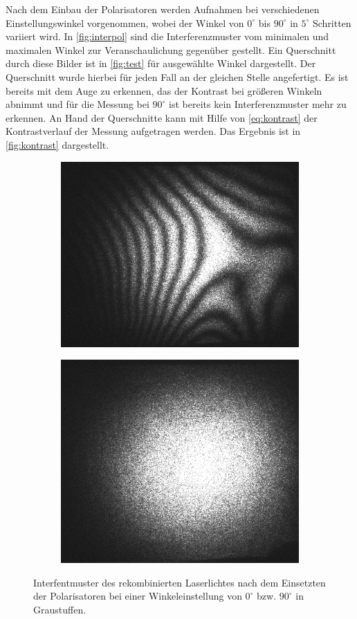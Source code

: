 \documentclass[numbers=noenddot,a4paper,notitlepage,twoside,BCOR15mm]{scrartcl}
\begin{document}
	Nach dem Einbau der Polarisatoren werden Aufnahmen bei verschiedenen Einstellungswinkel vorgenommen, wobei der Winkel von $0^\circ$ bis $90^\circ$ in $5^\circ$ Schritten variiert wird. In \autoref{fig:interpol} sind die Interferenzmuster vom minimalen und maximalen Winkel zur Veranschaulichung gegenüber gestellt. Ein Querschnitt durch diese Bilder ist in \autoref{fig:test} für ausgewählte Winkel dargestellt. Der Querschnitt wurde hierbei für jeden Fall an der gleichen Stelle angefertigt. Es ist bereits mit dem Auge zu erkennen, das der Kontrast bei größeren Winkeln abnimmt und für die Messung bei $90^\circ$ ist bereits kein Interferenzmuster mehr zu erkennen. An Hand der Querschnitte kann mit Hilfe von \autoref{eq:kontrast} der Kontrastverlauf der Messung aufgetragen werden. Das Ergebnis ist in \autoref{fig:kontrast} dargestellt.
	
	\begin{figure}
		\centering
		\begin{subfigure}{.49\textwidth}
			\centering
			\includegraphics[width=.7\linewidth]{pics/0grad_.png}
		\end{subfigure}
		\begin{subfigure}{.45\textwidth}
			\centering
			\includegraphics[width=.7\linewidth]{pics/90grad_.png}
		\end{subfigure}	
		\caption{Interfentmuster des rekombinierten Laserlichtes nach dem Einsetzten der Polarisatoren bei einer Winkeleinstellung von $0^\circ$ bzw. $90^\circ$ in Graustuffen.}
		\label{fig:interpol}
	\end{figure}
	
\end{document}
